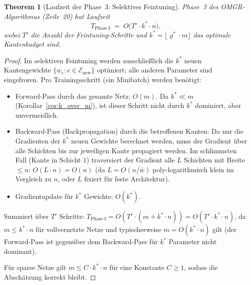 ﻿\documentclass[12pt, a4paper, openany]{report}
\newtheorem{theorem}{Theorem}[chapter]
\newcommand{\calE}{\mathcal{E}}
\begin{document}
\begin{theorem}[Laufzeit der Phase~3: Selektives Feintuning]
\label{thm:runtime_phase3}
Phase~3 des OMGR-Algorithmus (Zeile~20) hat Laufzeit
\begin{equation}
  \label{eq:runtime_phase3}
  T_{\mathrm{Phase\,3}} \;=\; O\!\bigl(T' \cdot k^* \cdot n\bigr),
\end{equation}
wobei $T'$ die Anzahl der Feintuning-Schritte und
$k^* = \lfloor\varrho^* \cdot m\rfloor$ das optimale Kantenbudget sind.
\end{theorem}

\begin{proof}
Im selektiven Feintuning werden ausschließlich die $k^*$ neuen Kantengewichte
$\{w_e : e \in \calE_{\mathrm{new}}\}$ optimiert; alle anderen Parameter sind eingefroren.
Pro Trainingsschritt (ein Minibatch) werden benötigt:
\begin{itemize}
  \item Forward-Pass durch das gesamte Netz: $O(m)$.  Da $k^* \ll m$
    (Korollar~\ref{cor:k_over_m}), ist dieser Schritt nicht durch $k^*$
    dominiert, aber unvermeidlich.
  \item Backward-Pass (Backpropagation) durch die betroffenen Kanten:
    Da nur die Gradienten der $k^*$ neuen Gewichte berechnet werden,
    muss der Gradient über alle Schichten bis zur jeweiligen Kante
    propagiert werden.  Im schlimmsten Fall (Kante in Schicht $1$)
    traversiert der Gradient alle $L$ Schichten mit Breite $\leq n$:
    $O(L \cdot n) = O(n)$ (da $L = O(n/\bar{w})$ poly-logarithmisch klein
    im Vergleich zu $n$, oder $L$ fixiert für feste Architektur).
  \item Gradientupdate für $k^*$ Gewichte: $O(k^*)$.
\end{itemize}
Summiert über $T'$ Schritte: $T_{\mathrm{Phase\,3}} = O(T' \cdot (m + k^* \cdot n))
= O(T' \cdot k^* \cdot n)$, da $m \leq k^* \cdot n$ für vollvernetzte Netze
und typischerweise $m = O(k^* \cdot n)$ gilt (der Forward-Pass ist
gegenüber dem Backward-Pass für $k^*$ Parameter nicht dominant).

Für sparse Netze gilt $m \leq C \cdot k^* \cdot n$ für eine Konstante $C \geq 1$,
sodass die Abschätzung korrekt bleibt.
\end{proof}
\end{document}
